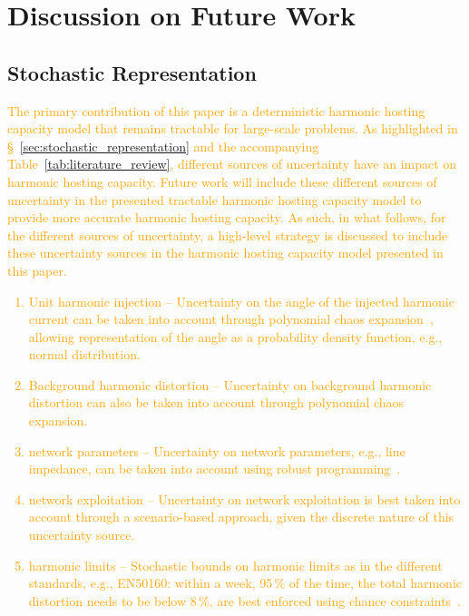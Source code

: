\section{Discussion on Future Work}
\label{sec:future_work}

\subsection{Stochastic Representation}

\textcolor{orange}{The primary contribution of this paper is a deterministic harmonic hosting capacity model that remains tractable for large-scale problems. As highlighted in \S~\ref{sec:stochastic_representation} and the accompanying Table~\ref{tab:literature_review}, different sources of uncertainty have an impact on harmonic hosting capacity. Future work will include these different sources of uncertainty in the presented tractable harmonic hosting capacity model to provide more accurate harmonic hosting capacity. As such, in what follows, for the different sources of uncertainty, a high-level strategy is discussed to include these uncertainty sources in the harmonic hosting capacity model presented in this paper.
\begin{enumerate}
    \item [a)] Unit harmonic injection -- Uncertainty on the angle of the injected harmonic current can be taken into account through polynomial chaos expansion~\cite{sullivan_introduction_2015}, allowing representation of the angle as a probability density function, e.g., normal distribution.
    \item [b)] Background harmonic distortion -- Uncertainty on background harmonic distortion can also be taken into account through polynomial chaos expansion.
    \item [c)] network parameters -- Uncertainty on network parameters, e.g., line impedance, can be taken into account using robust programming~\cite{nemirovski_robust_2019}.
    \item [d)] network exploitation -- Uncertainty on network exploitation is best taken into account through a scenario-based approach, given the discrete nature of this uncertainty source.
    \item [e)] harmonic limits -- Stochastic bounds on harmonic limits as in the different standards, e.g., EN50160: within a week, 95\,\% of the time, the total harmonic distortion needs to be below 8\,\%, are best enforced using chance constraints~\cite{birge_introduction_2011}.
\end{enumerate}}

